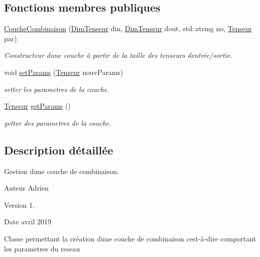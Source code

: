 \subsection*{Fonctions membres publiques}
\begin{DoxyCompactItemize}
\item 
\mbox{\label{classCoucheCombinaison_aa28fcb2c8d4197e75b43873a0824d38f}} 
\hyperlink{classCoucheCombinaison_aa28fcb2c8d4197e75b43873a0824d38f}{Couche\+Combinaison} (\hyperlink{classDimTenseur}{Dim\+Tenseur} din, \hyperlink{classDimTenseur}{Dim\+Tenseur} dout, std\+::string no, \hyperlink{classTenseur}{Tenseur} par)
\begin{DoxyCompactList}\small\item\em Constructeur d\textquotesingle{}une couche à partir de la taille des tenseurs d\textquotesingle{}entrée/sortie. \end{DoxyCompactList}\item 
\mbox{\label{classCoucheCombinaison_abdd34f81cb1298a4a9b2c8cef091db81}} 
void \hyperlink{classCoucheCombinaison_abdd34f81cb1298a4a9b2c8cef091db81}{set\+Params} (\hyperlink{classTenseur}{Tenseur} nouv\+Params)
\begin{DoxyCompactList}\small\item\em setter les parametres de la couche. \end{DoxyCompactList}\item 
\hyperlink{classTenseur}{Tenseur} \hyperlink{classCoucheCombinaison_a49d595f069641090c8fbbdff025db259}{get\+Params} ()
\begin{DoxyCompactList}\small\item\em getter des parametres de la couche. \end{DoxyCompactList}\end{DoxyCompactItemize}


\subsection{Description détaillée}
Gestion d\textquotesingle{}une couche de combinaison. 

\begin{DoxyAuthor}{Auteur}
Adrien 
\end{DoxyAuthor}
\begin{DoxyVersion}{Version}
1. 
\end{DoxyVersion}
\begin{DoxyDate}{Date}
avril 2019
\end{DoxyDate}
Classe permettant la création d\textquotesingle{}une couche de combinaison c\textquotesingle{}est-\/à-\/dire comportant les parametres du reseau 


